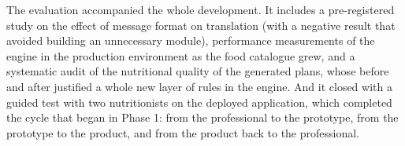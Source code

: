 The evaluation accompanied the whole development. It includes a pre-registered study on the effect of message format on translation (with a negative result that avoided building an unnecessary module), performance measurements of the engine in the production environment as the food catalogue grew, and a systematic audit of the nutritional quality of the generated plans, whose before and after justified a whole new layer of rules in the engine. And it closed with a guided test with two nutritionists on the deployed application, which completed the cycle that began in Phase 1: from the professional to the prototype, from the prototype to the product, and from the product back to the professional.
